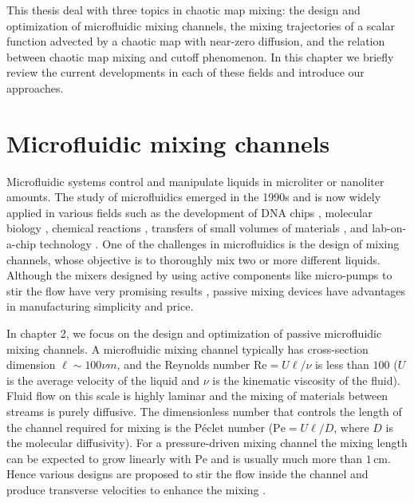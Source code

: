%
%
%


This thesis deal with three topics in chaotic map mixing: the design and optimization of microfluidic mixing channels, the mixing trajectories of a scalar function advected by a chaotic map with near-zero diffusion, and the relation between chaotic map mixing and cutoff phenomenon. In this chapter we briefly review the current developments in each of these fields and introduce our approaches.  

  

\section{Microfluidic mixing channels}
Microfluidic systems control and manipulate liquids in microliter or nanoliter amounts. The study of microfluidics emerged in the 1990s and
is now widely applied in various fields such as the development of DNA chips \cite{Burns1998}, molecular biology \cite{DavidJ2002},
chemical reactions \cite{Andersson2000}, transfers of small volumes of materials \cite{Sammarco1999}, and lab-on-a-chip technology
\cite{weigl2003,Stone2004}. One of the challenges in microfluidics is the design of mixing channels, whose objective is to thoroughly mix
two or more different liquids. Although the mixers designed by using active components like micro-pumps to stir the flow have very
promising results \cite{Yang2000,Deshmukh2000}, passive mixing devices have advantages in manufacturing simplicity and price.

In chapter 2, we focus on the design and optimization of passive microfluidic mixing channels. A microfluidic mixing channel typically has
cross-section dimension $\ell\sim 100\nu m$, and the Reynolds number $\text{Re}=U\ell/\nu$ is less than $100$ \cite{Stroock2002} ($U$ is the average
velocity of the liquid and $\nu$ is the kinematic viscosity of the fluid).  Fluid flow on this scale is highly laminar and the mixing of
materials between streams is purely diffusive. The dimensionless number that controls the length of the channel required for mixing is the
P\'{e}clet number ($\text{Pe}= U\ell/D$, where $D$ is the molecular diffusivity). For a pressure-driven mixing channel the mixing length can be
expected to grow linearly with $\text{Pe}$ and is usually much more than $1\,\text{cm}$. Hence various designs are proposed to stir the
flow inside the channel and produce transverse velocities to enhance the mixing \cite{Stroock2002, Ottino2004Science, Wiggins2004}.

